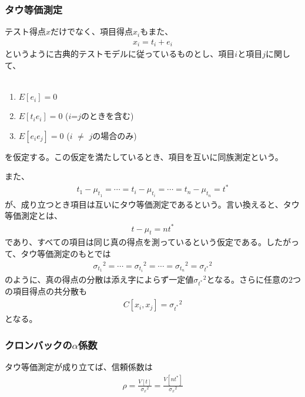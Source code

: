 \documentclass[a4paper,10pt]{jarticle}
\begin{document}
\subsubsection{タウ等価測定}
テスト得点$\displaystyle x$だけでなく、項目得点$\displaystyle x_{i}$もまた、
\begin{eqnarray}
  \displaystyle x_{i} = t_{i}+e_{i}
\end{eqnarray}
というように古典的テストモデルに従っているものとし、項目$i$と項目$j$に関して、\\
\\
\begin{enumerate}
  \item  $E[e_{i}] = 0$
  \item  $E[t_{i}e_{i}] = 0$ ($i$=$j$のときを含む)
  \item  $E[e_{i}e_{j}] = 0$ ($i$ $\neq$ $j$の場合のみ) 
\end{enumerate}
を仮定する。この仮定を満たしているとき、項目を互いに同族測定という。

また、
\begin{eqnarray}
  \displaystyle t_{1}-\mu_{t_{1}}=\cdots=t_{i}-\mu_{t_{i}}=\cdots=t_{n}-\mu_{t_{n}}=t^{\ast}
\end{eqnarray}
が、成り立つとき項目は互いにタウ等価測定であるという。言い換えると、タウ等価測定とは、
\begin{eqnarray}
  \displaystyle t-\mu_{t}=nt^{\ast}
\end{eqnarray}
であり、すべての項目は同じ真の得点を測っているという仮定である。したがって、タウ等価測定のもとでは
\begin{eqnarray}
  \displaystyle {\sigma_{t_{1}}}^2=\cdots={\sigma_{t_{i}}}^2=\cdots={\sigma_{t_{n}}}^2={\sigma_{t^\ast}}^2
\end{eqnarray}
のように、真の得点の分散は添え字によらず一定値$\displaystyle  {\sigma_{t^\ast}}^2$となる。さらに任意の$2$つの項目得点の共分散も
\begin{eqnarray}
  \displaystyle C[x_{i},x_{j}]={\sigma_{t^\ast}}^2
\end{eqnarray}
となる。
\subsubsection{クロンバックの$\displaystyle \alpha$係数}
タウ等価測定が成り立てば、信頼係数は
\begin{eqnarray}
  \displaystyle \rho=\frac{V[t]}{{\sigma_{x}}^2}=\frac{V[nt^{\ast}]}{{\sigma_{x}}^2}
\end{eqnarray}
\end{document}
